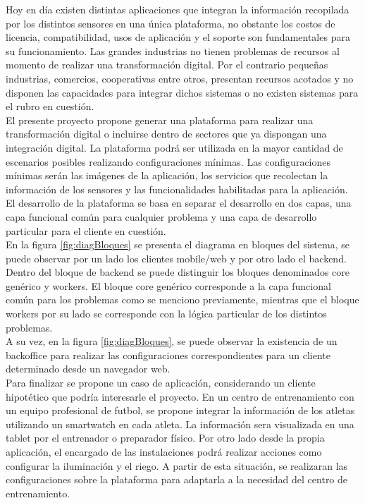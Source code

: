 \documentclass[
11pt, %
]{charter}
\begin{document}
 Hoy en día existen distintas aplicaciones que integran la información recopilada por los distintos sensores en una única plataforma, no obstante los costos de licencia, compatibilidad, usos de aplicación y el soporte son fundamentales para su funcionamiento.
 Las grandes industrias no tienen problemas de recursos al momento de realizar una transformación digital. Por el contrario pequeñas industrias, comercios, cooperativas entre otros, presentan recursos acotados y no disponen las capacidades para integrar dichos sistemas o no existen sistemas para el rubro en cuestión.\\
 El presente proyecto propone generar una plataforma para realizar una transformación digital o incluirse dentro de sectores que ya dispongan una integración digital.
La plataforma podrá ser utilizada en la mayor cantidad de escenarios posibles realizando configuraciones mínimas. Las configuraciones mínimas serán las imágenes de la aplicación, los servicios que recolectan la información de los sensores y las funcionalidades habilitadas para la aplicación.\\
El desarrollo de la plataforma se basa en separar el desarrollo en dos capas, una capa funcional común para cualquier problema y una capa de desarrollo particular para el cliente en cuestión.\\   
En la figura \ref{fig:diagBloques} se presenta el diagrama en bloques del sistema, se puede observar por un lado los clientes mobile/web y por otro lado el backend. Dentro del bloque de backend se puede distinguir los bloques denominados core genérico y workers. El bloque core genérico corresponde a la capa funcional común para los problemas como se menciono previamente, mientras que el bloque workers por su lado se corresponde con la lógica particular de los distintos problemas.\\
A su vez, en la figura \ref{fig:diagBloques}, se puede observar la existencia de un backoffice para realizar las configuraciones correspondientes para un cliente determinado desde un navegador web.\\
Para finalizar se propone un caso de aplicación, considerando un cliente hipotético que podría interesarle el proyecto.
En un centro de entrenamiento con un equipo profesional de futbol, se propone integrar la información  de los atletas utilizando un smartwatch en cada atleta. La información sera visualizada en una tablet por el entrenador o preparador físico. Por otro lado desde la propia aplicación, el encargado de las instalaciones podrá realizar acciones como configurar la iluminación y el riego.
A partir de esta situación, se realizaran las configuraciones sobre la plataforma para adaptarla a la necesidad del centro de entrenamiento.
\end{document}
